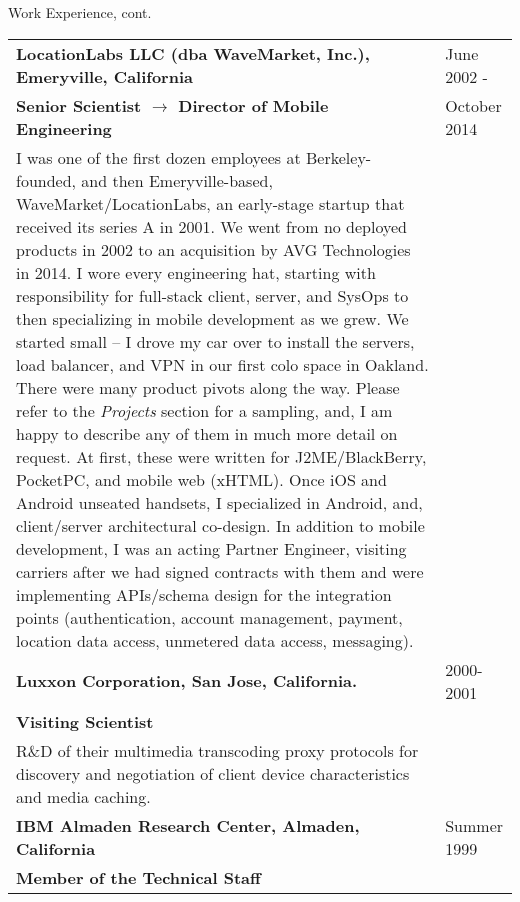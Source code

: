 \newpage
\begin{bf} \large
Work Experience, cont.
\end{bf}
\medskip

\begin{tabular}{p{5.2in}@{\hspace{1.5cm}}l}
	  
	\bf  LocationLabs LLC (dba WaveMarket, Inc.), Emeryville, California    & June 2002 -  \\
	\bf  Senior Scientist $\rightarrow$ Director of Mobile Engineering & October 2014 \\[4pt]
	
	   I was one of the first dozen employees at Berkeley-founded, and then Emeryville-based, 
	   WaveMarket/LocationLabs,
	   an early-stage startup that received its series A in 2001.
	   We went from no deployed products in 2002 to an
	   acquisition by AVG Technologies in 2014.  I wore every engineering hat, starting with responsibility
	   for full-stack client, server, and SysOps to
	   then specializing in mobile development as we grew.  
	   We started small -- 
	   I drove my car over to install the servers, load balancer, and VPN in our first colo space in Oakland.
	   There were many product pivots along the way. Please refer to the {\it Projects} section for a sampling, 
	   and, I am happy to describe any of them in much more detail on request.
	   At first, these were written for J2ME/BlackBerry, PocketPC, and mobile web (xHTML).
	   Once iOS and Android unseated handsets, 
	   I specialized in Android, and, client/server architectural co-design.  In addition to mobile development, I was an acting
	   Partner Engineer, visiting carriers after we had signed contracts
	   with them and were implementing APIs/schema design for the integration points
	    (authentication, account management, payment, location data access, unmetered data access, messaging). \\[9pt]
       	  
    \bf Luxxon Corporation, San Jose, California. & 2000-2001 \\
    \bf Visiting Scientist  \\[4pt]

       R\&D of their multimedia transcoding proxy
       protocols for discovery and negotiation of client
       device characteristics and media caching. \\[9pt]

    \bf IBM Almaden Research Center, 
          Almaden, California                         & Summer 1999 \\
    \bf Member of the Technical Staff \\[4pt]


\end{tabular}
